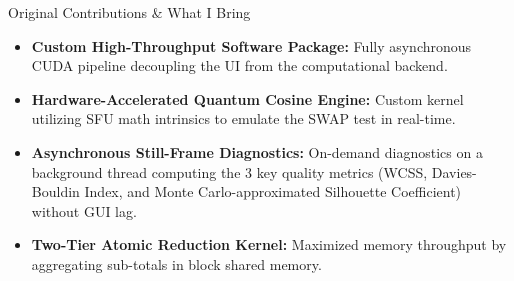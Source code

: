 \documentclass[11pt]{beamer}
\begin{document}
\begin{frame}{Original Contributions \& What I Bring}
    \begin{itemize}
        \item \textbf{Custom High-Throughput Software Package:} Fully asynchronous CUDA pipeline decoupling the UI from the computational backend.
        \item \textbf{Hardware-Accelerated Quantum Cosine Engine:} Custom kernel utilizing SFU math intrinsics to emulate the SWAP test in real-time.
        \item \textbf{Asynchronous Still-Frame Diagnostics:} On-demand diagnostics on a background thread computing the 3 key quality metrics (WCSS, Davies-Bouldin Index, and Monte Carlo-approximated Silhouette Coefficient) without GUI lag.
        \item \textbf{Two-Tier Atomic Reduction Kernel:} Maximized memory throughput by aggregating sub-totals in block shared memory.
    \end{itemize}
\end{frame}
\end{document}
